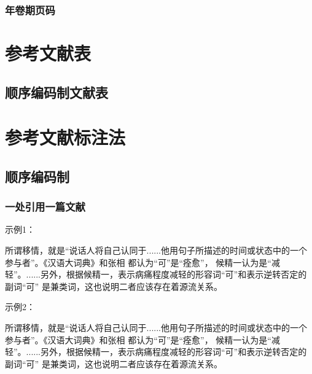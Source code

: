 \documentclass{article}
\begin{document}
\subsubsection{年卷期页码}
\begin{refsection}

\nocite{egdatevolnumpagea--,egdatevolnumpageb--,%
egdatevolnumpagec--,egdatevolnumpaged--,%
egdatevolnumpagee--,egdatevolnumpagef--,%
egdatevolnumpageg--}

\end{refsection}

\section{参考文献表}

\subsection{顺序编码制文献表}
\begin{refsection}

\nocite{Baker1995--,Chernik1982--,尼葛洛庞帝1996--,汪冰1997-16-16,杨宗英1996-24-29,Dowler1995-5-26}

\printbibliography[heading=subbibliography,title={示例}]
\end{refsection}

\section{参考文献标注法}
\subsection{顺序编码制}
\subsubsection{一处引用一篇文献}

\begin{refsection}
示例1：

所谓移情，就是“说话人将自己认同于......他用句子所描述的时间或状态中的一个参与者”\cite{Sunstein1996-903-903}。《汉语大词典》和张相
\cite{Morri2010--}都认为“可”是“痊愈”，
候精一认为是“减轻”\cite{罗杰斯2011-15-16}。......另外，根据候精一，表示病痛程度减轻的形容词“可”和表示逆转否定的副词“可”
是兼类词\cite{陈登原2000-29-29}，这也说明二者应该存在着源流关系。

示例2：

所谓移情，就是“说话人将自己认同于......他用句子所描述的时间或状态中的一个参与者”。《汉语大词典》和张相
都认为“可”是“痊愈”，
候精一认为是“减轻”。......另外，根据候精一，表示病痛程度减轻的形容词“可”和表示逆转否定的副词“可”
是兼类词，这也说明二者应该存在着源流关系。


\end{refsection}
\end{document}

